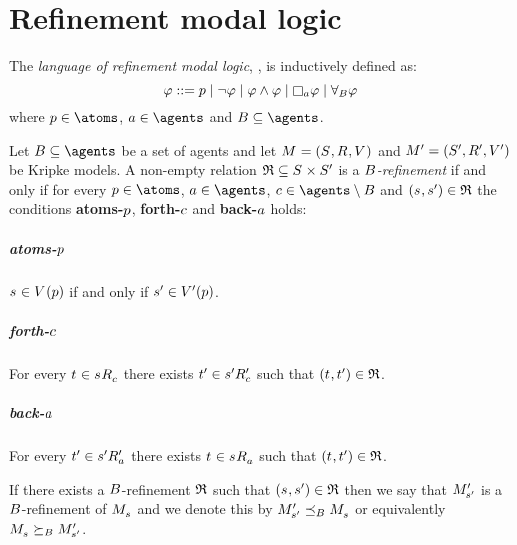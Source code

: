 \chapter{Refinement modal logic}\label{rml}

\begin{definition}
The {\em language of refinement modal logic}, \langRml{}, is inductively defined as:
$$
\phi ::= 
    \atomP \mid
    \lnot \phi \mid
    \phi \land \phi \mid
    \necessaryA \phi \mid
    \allrefsBs \phi
$$
where $\atomP \in \atoms$, $\agentA \in \agents$ and $\agentsB \subseteq \agents$.
\end{definition}

\begin{definition}[Refinements]
Let $\agentsB \subseteq \agents$ be a set of agents and let $\kModelAndTuple$ and $\kModelAndTupleP$ be Kripke models.
A non-empty relation $\refinement \subseteq \kStates \times \kStatesP$ is a {\em $B$-refinement} if and only if for every $\atomP \in \atoms$, $\agentA \in \agents$, $\agentC \in \agents \setminus \agentsB$ and $(\kStateS, \kStateSP) \in \refinement$ the conditions {\bf atoms-$p$}, {\bf forth-$c$} and {\bf back-$a$} holds:

\paragraph{atoms-$p$}
$\kStateS \in \kValuation(\atomP)$ if and only if ${s}^{\prime} \in {V^{\prime}}(p)$.

\paragraph{forth-$c$}
For every $\kStateT \in \kSuccessorsC{\kStateS}$ there exists ${t}^{\prime} \in {{s}^{\prime}} {R^{\prime}_{c}}$ such that $(\kStateT, \kStateTP) \in \refinement$.

\paragraph{back-$a$}
For every ${t}^{\prime} \in {{s}^{\prime}} {R^{\prime}_{a}}$ there exists $\kStateT \in \kSuccessorsA{\kStateS}$ such that $(\kStateT, \kStateTP) \in \refinement$.

If there exists a $B$-refinement $\mathfrak{R}$ such that $(\kStateS, \kStateSP) \in \refinement$ then we say that ${M^{\prime}_{{s}^{\prime}}}$ is a $B$-refinement of $\kPModel{\kStateS}$ and we denote this by $\kPModelP{\kStateSP} \refinesBs \kPModel{\kStateS}$ or equivalently $\kPModel{\kStateS} \simulatesBs \kPModelP{\kStateSP}$.
\end{definition}

